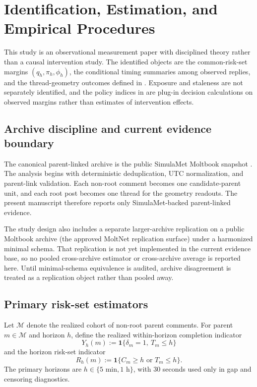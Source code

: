 \section{Identification, Estimation, and Empirical Procedures}
\label{sec:methods}
\StageThreeSectionNote

This study is an observational measurement paper with disciplined theory rather
than a causal intervention study. The identified objects are the common-risk-set
margins \((q_h,\pi_h,\phi_h)\), the conditional timing summaries among observed
replies, and the thread-geometry outcomes defined in . Exposure
and staleness are not separately identified, and the policy indices in
 are plug-in decision calculations on observed
margins rather than estimates of intervention effects.

\subsection{Archive discipline and current evidence boundary}
\label{sec:methods:design}

The canonical parent-linked archive is the public SimulaMet Moltbook snapshot
\citep{simulamet2026observatoryarchive}. The analysis begins with deterministic
deduplication, UTC normalization, and parent-link validation. Each non-root
comment becomes one candidate-parent unit, and each root post becomes one thread
for the geometry readouts. The present manuscript therefore reports only
SimulaMet-backed parent-linked evidence.

The study design also includes a separate larger-archive replication on a public
Moltbook archive (the approved MoltNet replication surface) under a harmonized
minimal schema. That replication is not yet implemented in the current evidence
base, so no pooled cross-archive estimator or cross-archive average is reported
here. Until minimal-schema equivalence is audited, archive disagreement is
treated as a replication object rather than pooled away.

\subsection{Primary risk-set estimators}
\label{sec:methods:def-est}
\label{sec:methods:two-part}

Let \(\mathcal{M}\) denote the realized cohort of non-root parent comments. For
parent \(m\in\mathcal{M}\) and horizon \(h\), define the realized within-horizon
completion indicator
\[
Y_h(m):=\mathbf{1}\{\delta_m=1,\ T_m\le h\}
\]
and the horizon risk-set indicator
\[
R_h(m):=\mathbf{1}\{C_m\ge h \text{ or } T_m\le h\}.
\]
The primary horizons are \(h\in\{5\text{ min},1\text{ h}\}\), with
\(30\) seconds used only in gap and censoring diagnostics.


